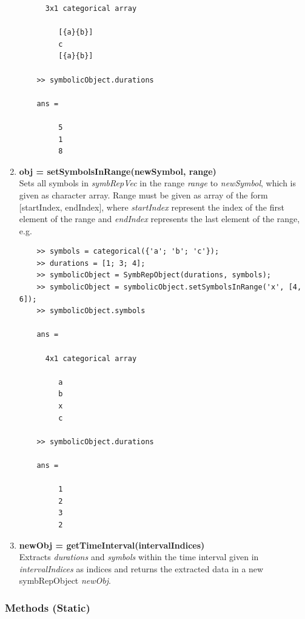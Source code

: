 \documentclass[a4]{scrreprt}
\begin{document}
\begin{enumerate}
\begin{verbatim}
	  3x1 categorical array
	
	     [{a}{b}] 
	     c 
	     [{a}{b}] 
	
	>> symbolicObject.durations
	
	ans =
	
	     5
	     1
	     8	
	\end{verbatim}
	

	

	
	\item \textbf{obj = setSymbolsInRange(newSymbol, range)}\\
	Sets all symbols in \textit{symbRepVec} in the range \textit{range} to \textit{newSymbol}, which is given as character array. Range must be given as array of the form [startIndex, endIndex], where \textit{startIndex} represent the index of the first element of the range and \textit{endIndex} represents the last element of the range, e.g.
	\begin{verbatim}
	>> symbols = categorical({'a'; 'b'; 'c'});
	>> durations = [1; 3; 4];
	>> symbolicObject = SymbRepObject(durations, symbols);
	>> symbolicObject = symbolicObject.setSymbolsInRange('x', [4, 6]);
	>> symbolicObject.symbols
	
	ans = 
	
	  4x1 categorical array
	
	     a 
	     b 
	     x 
	     c 
	
	>> symbolicObject.durations
	
	ans =
	
	     1
	     2
	     3
	     2	
	\end{verbatim}
	

    

    \item \textbf{newObj = getTimeInterval(intervalIndices)}\\
	Extracts \textit{durations} and \textit{symbols} within the time interval given in \textit{intervalIndices} as indices and returns the extracted data in a new symbRepObject \textit{newObj}.


	

	

	
	
\end{enumerate}

\subsubsection{Methods (Static)}
\end{document}
